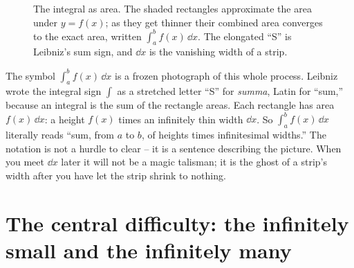 \begin{figure}[H]
\centering
{}
\caption{The integral as area. The shaded rectangles approximate the area under
$y=f(x)$; as they get thinner their combined area converges to the exact area,
written $\int_a^b f(x)\,\dd x$. The elongated ``S'' is Leibniz's sum sign, and
$\dd x$ is the vanishing width of a strip.}
\label{ch01:fig-area}
\end{figure}

\begin{happeningbox}
The symbol $\displaystyle\int_a^b f(x)\,\dd x$ is a frozen photograph of this
whole process. Leibniz wrote the integral sign $\int$ as a stretched letter
``S'' for \emph{summa}, Latin for ``sum,'' because an integral is the sum of the
rectangle areas. Each rectangle has area $f(x)\,\dd x$: a height $f(x)$ times an
infinitely thin width $\dd x$. So $\int_a^b f(x)\,\dd x$ literally reads ``sum,
from $a$ to $b$, of heights times infinitesimal widths.'' The notation is not a
hurdle to clear -- it is a sentence describing the picture. When you meet $\dd x$
later it will not be a magic talisman; it is the ghost of a strip's width after
you have let the strip shrink to nothing.
\end{happeningbox}

\section{The central difficulty: the infinitely small and the infinitely many}

